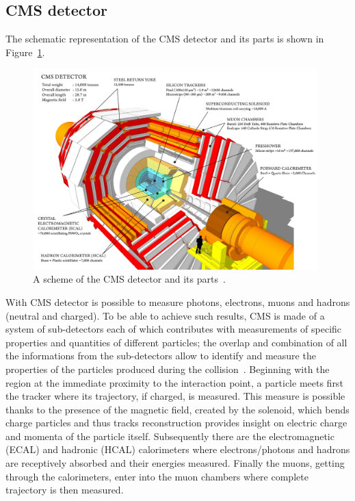 \subsection{CMS detector}\label{sec:cmsdetector}
The schematic representation of the CMS detector and its parts is
shown in Figure~\ref{fig:detector}.
\begin{figure}[h]
\centering
\includegraphics[width=0.98\textwidth]{Figures/c2/cms_160312_06-compressed.pdf}
\vspace*{3mm}
\caption{A scheme of the CMS detector and its parts~\cite{webpage_cms}.}
\label{fig:detector}
\end{figure} 

With CMS detector is possible to measure photons, electrons, muons and hadrons (neutral and charged). 
To be able to achieve such results, CMS is made of a system of sub-detectors each of which contributes with
measurements of specific properties and quantities of different 
particles; the overlap and combination of all the
informations from the sub-detectors allow to identify and measure the
properties of the particles produced during the collision~\cite{Sirunyan_2017}. Beginning
with the region at the immediate proximity to the interaction point, a
particle meets first the tracker where its trajectory, if charged, is
measured. This measure is possible thanks to the presence of the
magnetic field, created by the solenoid, which bends charge particles
and thus tracks reconstruction provides insight on electric charge and
momenta of the particle itself. Subsequently there are the
electromagnetic (ECAL) and hadronic (HCAL) calorimeters where
electrons/photons and hadrons are receptively absorbed and their
energies measured. Finally the muons, getting through the
calorimeters, enter into the muon chambers where complete trajectory
is then measured. 

